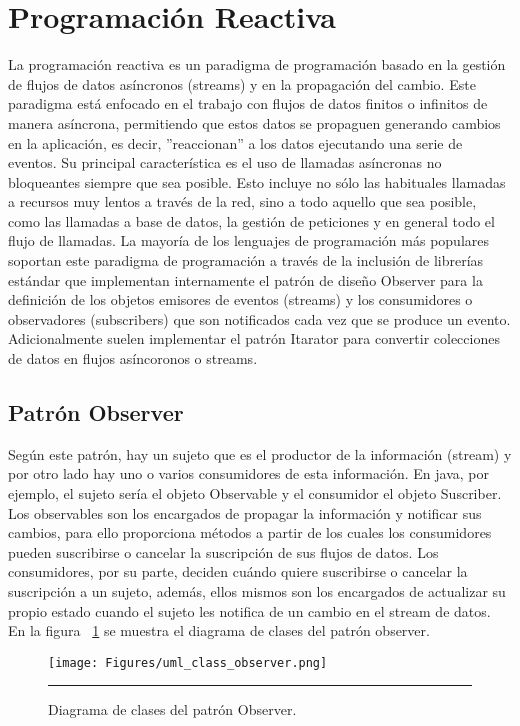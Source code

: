 \section{Programación Reactiva}

La programación reactiva es un paradigma de programación basado en la gestión de flujos de datos asíncronos (streams) y en la propagación del cambio.
Este paradigma está enfocado en el trabajo con flujos de datos finitos o infinitos de manera asíncrona, permitiendo que estos datos se propaguen generando cambios en la aplicación, es decir, ''reaccionan'' a los datos ejecutando una serie de eventos.
Su principal característica es el uso de llamadas asíncronas no bloqueantes siempre que sea posible. Esto incluye no sólo las habituales llamadas a recursos muy lentos a través de la red, sino a todo aquello que sea posible, como las llamadas a base de datos, la gestión de peticiones y en general todo el flujo de llamadas.
La mayoría de los lenguajes de programación más populares soportan este paradigma de programación a través de la inclusión de librerías estándar que implementan internamente el patrón de diseño Observer para la definición de los objetos emisores de eventos (streams) y los consumidores o observadores (subscribers) que son notificados cada vez que se produce un evento.
Adicionalmente suelen implementar el patrón Itarator para convertir colecciones de datos en flujos asíncoronos o streams.
\subsection{Patrón Observer}
Según este patrón, hay un sujeto que es el productor de la información (stream) y por otro lado hay uno o varios consumidores de esta información. En java, por ejemplo, el sujeto sería el objeto Observable y el consumidor el objeto  Suscriber.
Los observables son los encargados de propagar la información y notificar sus cambios, para ello proporciona métodos a partir de los cuales los consumidores pueden suscribirse o cancelar la suscripción de sus flujos de datos.
Los consumidores, por su parte, deciden cuándo quiere suscribirse o cancelar la suscripción a un sujeto, además, ellos mismos son los encargados de actualizar su propio estado cuando el sujeto les notifica de un cambio en el stream de datos. En la figura ~\ref{fig:uml_class_observer} se muestra el diagrama de clases del patrón observer.
\begin{figure}[htbp]
	\centering
	\texttt{[image: Figures/uml\_class\_observer.png]}
	\rule{35em}{1pt}
	\caption[Observer Class Diagram]{Diagrama de clases del patrón Observer.}
	\label{fig:uml_class_observer}
\end{figure}
